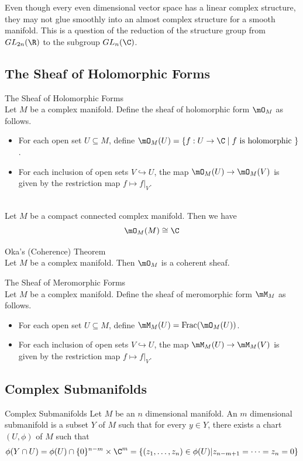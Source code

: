 \documentclass[a4paper]{article}
\begin{document}
Even though every even dimensional vector space has a linear complex structure, they may not glue smoothly into an almost complex structure for a smooth manifold. This is a question of the reduction of the structure group from $GL_{2n}(\R)$ to the subgroup $GL_n(\C)$. 

\subsection{The Sheaf of Holomorphic Forms}
\begin{defn}{The Sheaf of Holomorphic Forms}{}\\
Let $M$ be a complex manifold. Define the sheaf of holomorphic form $\mO_M$ as follows. 
\begin{itemize}
\item For each open set $U\subseteq M$, define $\mO_M(U)=\{f:U\to\C\;|\;f\text{ is holomorphic }\}$. 
\item For each inclusion of open sets $V\hookrightarrow U$, the map $\mO_M(U)\to\mO_M(V)$ is given by the restriction map $f\mapsto f|_V$. 
\end{itemize}
\end{defn}

\begin{lmm}{}{}\\
Let $M$ be a compact connected complex manifold. Then we have $$\mO_M(M)\cong\C$$
\end{lmm}

\begin{thm}{Oka's (Coherence) Theorem}{}\\
Let $M$ be a complex manifold. Then $\mO_M$ is a coherent sheaf. 
\end{thm}

\begin{defn}{The Sheaf of Meromorphic Forms}{}\\
Let $M$ be a complex manifold. Define the sheaf of meromorphic form $\mM_M$ as follows. 
\begin{itemize}
\item For each open set $U\subseteq M$, define $\mM_M(U)=\text{Frac}(\mO_M(U))$. 
\item For each inclusion of open sets $V\hookrightarrow U$, the map $\mM_M(U)\to\mM_M(V)$ is given by the restriction map $f\mapsto f|_V$. 
\end{itemize}
\end{defn}

\subsection{Complex Submanifolds}
\begin{defn}{Complex Submanifolds}{} Let $M$ be an $n$ dimensional manifold. An $m$ dimensional submanifold is a subset $Y$ of $M$ such that for every $y\in Y$, there exists a chart $(U,\phi)$ of $M$ such that $$\phi(Y\cap U)=\phi(U)\cap\{0\}^{n-m}\times\C^m=\{(z_1,\dots,z_n)\in\phi(U)|z_{n-m+1}=\dots=z_n=0\}$$
\end{defn}
\end{document}
